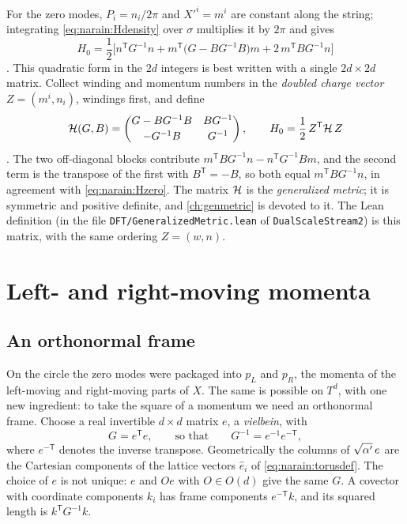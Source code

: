 For the zero modes, $P_i=n_i/2\pi$ and $X'^i=m^i$ are constant along the string; integrating
\eqref{eq:narain:Hdensity} over $\sigma$ multiplies it by $2\pi$ and gives
\begin{equation}\label{eq:narain:Hzero}
 H_0=\frac12\Big[n^{\mathsf T}G^{-1}n+m^{\mathsf T}\big(G-BG^{-1}B\big)m
 +2\,m^{\mathsf T}BG^{-1}n\Big]
\end{equation}
. This quadratic form in the $2d$ integers is
best written with a single $2d\times2d$ matrix. Collect winding and momentum numbers in the
\emph{doubled charge vector} $Z=(m^i,n_i)$, windings first, and
define
\begin{equation}\label{eq:narain:genmetric}
 \mathcal{H}(G,B)=\begin{pmatrix}G-BG^{-1}B&BG^{-1}\\[2pt]-G^{-1}B&G^{-1}\end{pmatrix},
 \qquad H_0=\frac12\,Z^{\mathsf T}\mathcal{H}\,Z
\end{equation}
.
The two off-diagonal blocks contribute $m^{\mathsf T}BG^{-1}n-n^{\mathsf T}G^{-1}Bm$, and the second
term is the transpose of the first with $B^{\mathsf T}=-B$, so both equal $m^{\mathsf T}BG^{-1}n$,
in agreement with \eqref{eq:narain:Hzero}. The matrix $\mathcal{H}$ is the \emph{generalized
metric}; it is symmetric and positive definite, and
\cref{ch:genmetric} is devoted to it. The Lean definition  (in the file
\texttt{DFT/GeneralizedMetric.lean} of \texttt{DualScaleStream2}) is this matrix, with the
same ordering $Z=(w,n)$.

\section{Left- and right-moving momenta}\label{sec:narain:pLpR}

\subsection{An orthonormal frame}

On the circle the zero modes were packaged into $p_L$ and $p_R$, the momenta of the
left-moving and right-moving parts of $X$. The same is possible on $T^d$, with one new
ingredient: to take the square of a momentum we need an orthonormal frame. Choose a real
invertible $d\times d$ matrix $e$, a \emph{vielbein}, with
\begin{equation}\label{eq:narain:vielbein}
 G=e^{\mathsf T}e,\qquad\text{so that}\qquad G^{-1}=e^{-1}e^{-\mathsf T},
\end{equation}
where $e^{-\mathsf T}$ denotes the inverse transpose. Geometrically the columns of
$\sqrt{\alpha'}\,e$ are the Cartesian components of the lattice vectors $\hat e_i$ of
\eqref{eq:narain:torusdef}. The choice of $e$ is not unique: $e$ and $Oe$ with $O\in O(d)$
give the same $G$. A covector with coordinate components $k_i$ has frame components
$e^{-\mathsf T}k$, and its squared length is $k^{\mathsf T}G^{-1}k$.

